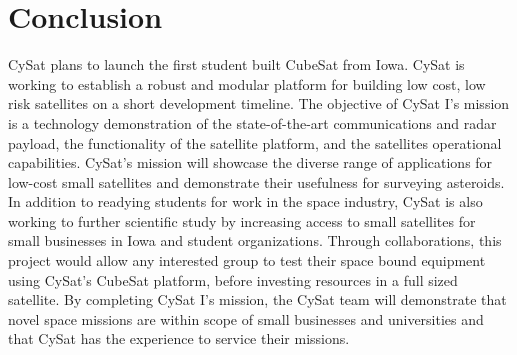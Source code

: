 \documentclass[nocover]            %
{CSLI}                       %
\begin{document}
\newpage
\section{Conclusion}
CySat plans to launch the first student built CubeSat from Iowa. CySat is working to establish a robust and modular platform for building low cost, low risk satellites on a short development timeline. The objective of CySat I's mission is a technology demonstration of the state-of-the-art communications and radar payload, the functionality of the satellite platform, and the satellites operational capabilities. CySat's mission will showcase the diverse range of applications for low-cost small satellites and demonstrate their usefulness for surveying asteroids. In addition to readying students for work in the space industry, CySat is also working to further scientific study by increasing access to small satellites for small businesses in Iowa and student organizations. Through collaborations, this project would allow any interested group to test their space bound equipment using CySat's CubeSat platform, before investing resources in a full sized satellite. By completing CySat I's mission, the CySat team will demonstrate that novel space missions are within scope of small businesses and universities and that CySat has the experience to service their missions.
\newpage
\end{document}
